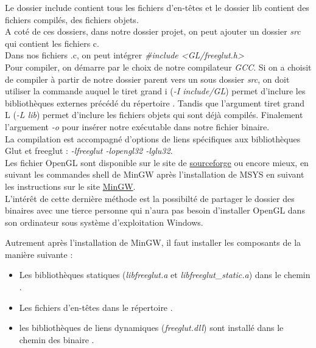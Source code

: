 \documentclass[12pt]{article}
\begin{document}
Le dossier include contient tous les fichiers d'en-têtes et le dossier lib contient des fichiers compilés, des fichiers objets.\\

A coté de ces dossiers, dans notre dossier projet, on peut ajouter un dossier \emph{src} qui contient les fichiers c.\\

Dans nos fichiers .c, on peut intégrer \emph{\#include <GL/freeglut.h>}\\

Pour compiler, on démarre par le choix de notre compilateur \emph{GCC}. Si on a choisit de compiler à partir de notre dossier parent vers un sous dossier \emph{src}, on doit utiliser la commande  auquel le tiret grand i (\emph{-I include/GL}) permet d'inclure les bibliothèques externes précédé du répertoire . Tandis que l'argument tiret grand L (\emph{-L lib}) permet d'inclure les fichiers objets qui sont déjà compilés. Finalement l'arguement \emph{-o } pour insérer notre exécutable dans notre fichier binaire.\\

La compilation est accompagné d'options de liens spécifiques aux bibliothèques Glut et freeglut : \emph{-lfreeglut -lopengl32 -lglu32}.\\

Les fichier OpenGL sont disponible sur le site de \href{https://sourceforge.net/projects/mingw/files/latest/download}{sourceforge} ou encore mieux, en suivant les commandes shell de MinGW après l'installation de MSYS en suivant les instructions sur le site \href{http://www.mingw.org/wiki/HOWTO_Compile_the_OpenGL_Utility_Toolkit_GLUT_for_Win32_with_MinGW}{MinGW}\cite{MinGW2}.\\

L'intérêt de cette dernière méthode est la possibilté de partager le dossier des binaires avec une tierce personne qui n'aura pas besoin d'installer OpenGL dans son ordinateur sous système d'exploitation Windows.\\


Autrement après l'installation de MinGW, il faut installer les composants de la manière suivante :
\begin{itemize} [label=\textbullet]
\item Les bibliothèques statiques (\emph{libfreeglut.a} et \emph{libfreeglut\_static.a}) dans le chemin .
\item Les fichiers d'en-têtes dans le répertoire .
\item les bibliothèques de liens dynamiques (\emph{freeglut.dll}) sont installé dans le chemin des binaire .
\end{itemize}
\end{document}

